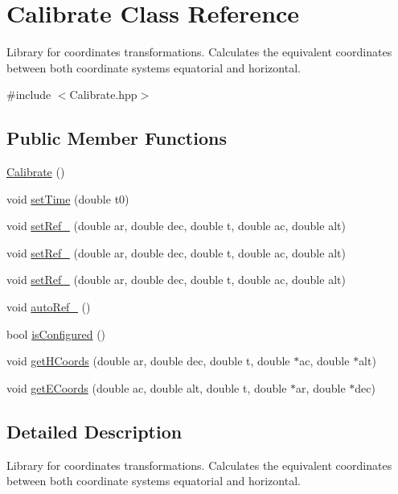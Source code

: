 \hypertarget{class_calibrate}{\section{Calibrate Class Reference}
\label{class_calibrate}
}


Library for coordinates transformations. Calculates the equivalent coordinates between both coordinate systems equatorial and horizontal.  




{\ttfamily \#include $<$Calibrate.\-hpp$>$}

\subsection*{Public Member Functions}
\begin{DoxyCompactItemize}
\item 
\hyperlink{class_calibrate_af7fd8ee2339ee66f6f8e4d9953025796}{Calibrate} ()
\item 
void \hyperlink{class_calibrate_aa995deb89e9bf1afe158a9863feeb9b5}{set\-Time} (double t0)
\item 
void \hyperlink{class_calibrate_accdf063b97064170400a396d50ca364a}{set\-Ref\-\_} (double ar, double dec, double t, double ac, double alt)
\item 
void \hyperlink{class_calibrate_a0de0f875a4426d90c7c67cf9aa7a117c}{set\-Ref\-\_} (double ar, double dec, double t, double ac, double alt)
\item 
void \hyperlink{class_calibrate_af3f3b8373b846d5e19006feef1a29c96}{set\-Ref\-\_} (double ar, double dec, double t, double ac, double alt)
\item 
void \hyperlink{class_calibrate_a21d7622c2356e44897dbfed2f9d9d1d9}{auto\-Ref\-\_} ()
\item 
bool \hyperlink{class_calibrate_a55a935c9efccedcc965cc9de4da5d3be}{is\-Configured} ()
\item 
void \hyperlink{class_calibrate_a611a5a3f616c57325493a4552aadab2c}{get\-H\-Coords} (double ar, double dec, double t, double $\ast$ac, double $\ast$alt)
\item 
void \hyperlink{class_calibrate_ab7e978f3fff297d01addb3decdc2ae15}{get\-E\-Coords} (double ac, double alt, double t, double $\ast$ar, double $\ast$dec)
\end{DoxyCompactItemize}


\subsection{Detailed Description}
Library for coordinates transformations. Calculates the equivalent coordinates between both coordinate systems equatorial and horizontal. 

